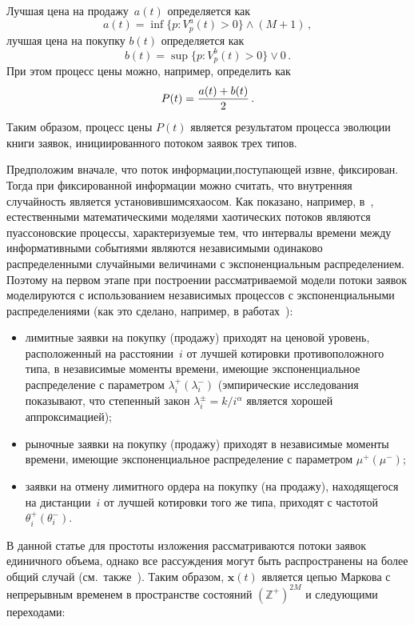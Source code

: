 \begin{multicols}{2}
Лучшая цена на продажу~$a(t)$ определяется как
$$
a(t) = \inf \{p: V^a_p(t) > 0\} \wedge (M + 1)\,,
$$
лучшая цена на покупку $b(t)$ определяется как
$$
b(t) = \sup \{p: V^b_p(t) > 0\} \vee 0\,.
$$
При этом процесс цены можно, например, определить как
$$
P(t) = \displaystyle\frac{\displaystyle a(t) + b(t)\mathstrut}{\displaystyle 2\mathstrut}\,.
$$
Таким образом, процесс цены $P(t)$ является результатом процесса
эволюции книги заявок, инициированного потоком заявок трех типов.

Предположим вначале, что поток информации,\linebreak поступающей извне,
фиксирован. Тогда при фиксированной информации можно считать, что
внут\-рен\-няя случайность является установившимся\linebreak хаосом. Как показано,
например, в~\cite{Korolev2011-1, KorolevBeningShorgin2011-1},
естественными математическими моделями хаотических потоков являются
пуассоновские процессы, характеризуемые тем, что интервалы времени
между информативными событиями являются независимыми одинаково
распределенными случайными величинами с экспоненциальным
распределением. Поэтому на первом этапе при построении
рас\-смат\-ри\-ва\-емой модели потоки заявок моделируются с использованием
независимых процессов с экспоненциальными распределениями (как это
сделано, например, в работах~\cite{ContRamaStoikov2010b, ContLarrard2011}):
\begin{itemize}
\item лимитные заявки на покупку (продажу) приходят на ценовой
уровень, расположенный на расстоянии~$i$ от лучшей котировки
противоположного типа, в независимые моменты времени, имеющие
экспоненциальное распределение с па\-ра\-мет\-ром $\lambda_i^{+} (\lambda_i^{-})$ 
(эмпирические исследования~\cite{Bouchaud2002, ZovkoFarmer2002} 
показывают, что степенный закон
$\lambda_i^{\pm} = {k}/{i^\alpha}$
является хорошей аппроксимацией);
\item рыночные заявки на покупку (продажу) приходят в независимые
моменты времени, име\-ющие экспоненциальное распределение с параметром $\mu^{+} (\mu^{-})$;
\item заявки на отмену лимитного ордера на покупку (на продажу),
находящегося на дистанции~$i$ от лучшей котировки того же типа,
приходят с частотой $\theta_i^{+} (\theta_i^{-})$.
\end{itemize}

В данной статье для простоты изложения рассматриваются потоки заявок
единичного объема, однако все рассуждения могут быть распространены
на более общий случай (см.\ также~\cite{Huang2012}). Таким образом,
$\mathbf{x}(t)$ является цепью Маркова с непрерывным временем в
пространстве состояний $(\mathbb{Z}^{+})^{2M}$ и следующими
переходами:


\end{multicols}

